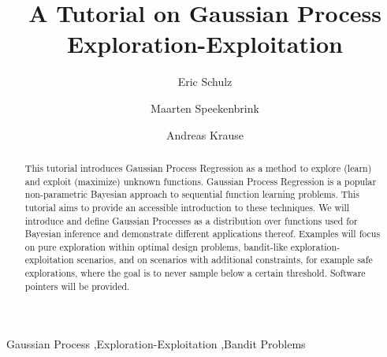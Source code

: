\documentclass[authoryear,11pt,review]{elsarticle}
\begin{document}
\begin{frontmatter}
\title{A Tutorial on Gaussian Process Exploration-Exploitation}
\author{Eric Schulz}
\author{ Maarten Speekenbrink}
\author{Andreas Krause}
\address{Computational Learning and Decision Making Laboratory \\ University College London}
\address{ Learning and Adaptive Systems Group \\ ETH Z\"urich}

\begin{abstract}
This tutorial introduces Gaussian Process Regression as a method to explore (learn) and exploit (maximize) unknown functions. Gaussian Process Regression is a popular non-parametric Bayesian approach to sequential function learning problems. This tutorial aims to provide an accessible introduction to these techniques. We will introduce and define Gaussian Processes as a distribution over functions used for Bayesian inference and demonstrate different applications thereof. Examples will focus on pure exploration within optimal design problems, bandit-like exploration-exploitation scenarios, and on scenarios with additional constraints, for example safe explorations, where the goal is to never sample below a certain threshold. Software pointers will be provided.
\end{abstract}
\begin{keyword}
Gaussian Process \sep Exploration-Exploitation \sep Bandit Problems
\end{keyword}
\end{frontmatter}
\linenumbers
\newpage

\end{document}
